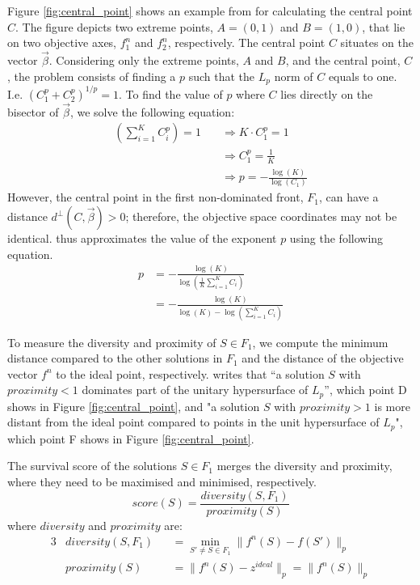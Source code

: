 \documentclass[mscthesis, 11pt]{usiinfthesis}
\theoremstyle{newdefinition}
\begin{document}
Figure \ref{fig:central_point} shows an example from \cite[~p.~598]{panichella_adaptive_2019} for calculating the central point $C$. The figure depicts two extreme points, $A=(0,1)$ and $B=(1,0)$, that lie on two objective axes, $f^n_1$ and $f^n_2$, respectively. The central point $C$ situates on the vector $\vec{\beta}$. Considering only the extreme points, $A$ and $B$, and the central point, $C$, the problem consists of finding a $p$ such that the $L_p$ norm of $C$ equals to one. I.e. $(C_1^p + C_2^p)^{1/p} = 1.$ To find the value of $p$ where $C$ lies directly on the bisector of $\vec{\beta}$, we solve the following equation:
\begin{equation}
\begin{aligned}
\left(\sum_{i=1}^K C_i^p \right) = 1 \quad & \Rightarrow K \cdot C_1^p = 1 \\
    &\Rightarrow C_1^p = \frac{1}{K} \\
    &\Rightarrow p = -\frac{\log(K)}{\log(C_1)}
\end{aligned}
\end{equation}
However, the central point in the first non-dominated front, $F_1$, can have a distance $d^{\perp}(C,\vec{\beta}) > 0$; therefore, the objective space coordinates may not be identical. \cite[~p.~598]{panichella_adaptive_2019} thus approximates the value of the exponent $p$ using the following equation.
\begin{equation}
\begin{aligned}
    p &= - \frac{\log(K)}{\log(\frac{1}{K} \sum_{i=1}^K C_i)}\\
    &= - \frac{\log(K)}{\log(K) - \log(\sum_{i=1}^K C_i)}
\end{aligned}
\end{equation}

To measure the diversity and proximity of $S \in F_1$, we compute the minimum distance compared to the other solutions in $F_1$ and the distance of the objective vector $f^n$ to the ideal point, respectively. \cite[~p.~599]{panichella_adaptive_2019} writes that ``a solution $S$ with $proximity < 1$ dominates part of the unitary hypersurface of $L_p$'', which point D shows in Figure \ref{fig:central_point}, and "a solution $S$ with $proximity > 1$ is more distant from the ideal point compared to points in the unit hypersurface of $L_p$", which point F shows in Figure \ref{fig:central_point}. 

The survival score of the solutions $S \in F_1$ merges the diversity and proximity, where they need to be maximised and minimised, respectively.
\begin{equation}
    score(S) = \frac{diversity(S,F_1)}{proximity(S)}
\end{equation}
where $diversity$ and $proximity$ are:
\begin{alignat}{3}
    &diversity(S, F_1) &&= \min_{S' \neq S \in F_1} \lVert f^n(S) - f(S') \rVert_p \\
    &proximity(S) &&= \lVert f^n (S) - z^{ideal} \rVert_p = \lVert f^n(S) \rVert_p
\end{alignat}
\end{document}
